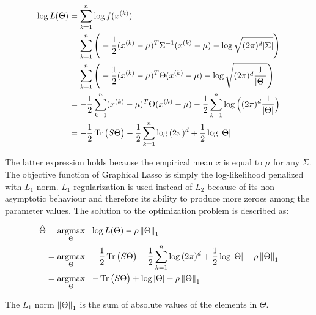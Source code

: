         \begin{equation}
            \begin{split}
                \log{L}(\Theta) & = \sum\limits_{k=1}^{n} \log{f(x^{(k)})} \\
                & = \sum\limits_{k=1}^{n} \Bigg( -\frac{1}{2} (x^{(k)} - \mu)^T \Sigma^{-1} (x^{(k)} - \mu) - \log{\sqrt{(2\pi)^d \vert\Sigma\vert}} \Bigg) \\
                & = \sum\limits_{k=1}^{n} \Bigg( -\frac{1}{2} (x^{(k)} - \mu)^T \Theta (x^{(k)} - \mu) - \log{\sqrt{(2\pi)^d \frac{1}{\vert\Theta\vert}}} \Bigg) \\
                & = -\frac{1}{2} \sum\limits_{k=1}^{n} (x^{(k)} - \mu)^T \Theta (x^{(k)} - \mu) 
                    - \frac{1}{2} \sum\limits_{k=1}^{n} \log{\Big((2\pi)^d \frac{1}{\vert\Theta\vert}\Big)} \\
                & = -\frac{1}{2} \operatorname{Tr}\big(S \Theta\big) - \frac{1}{2} \sum\limits_{k=1}^{n} \log{(2\pi)^d} + \frac{1}{2} \log{\vert\Theta\vert} \\
            \end{split}
        \end{equation}

        The latter expression holds because the empirical mean $\bar{x}$ is equal to $\mu$ for any $\Sigma$.
        The objective function of Graphical Lasso is simply the log-likelihood penalized with $L_1$ norm. $L_1$ regularization is used instead of $L_2$ because
        of its non-asymptotic behaviour and therefore its ability to produce more zeroes among the parameter values.
        The solution to the optimization problem is described as:

        \begin{equation}
            \begin{split}
                \hat{\Theta} & = \argmax_{\Theta} \ \ \log{L}(\Theta) - \rho \norm{\Theta}_1 \\
                & = \argmax_{\Theta} \ \ -\frac{1}{2} \trace\big(S \Theta\big) - \frac{1}{2} \sum\limits_{k=1}^{n} 
                    \log{(2\pi)^d} + \frac{1}{2} \log{\vert\Theta\vert} - \rho \norm{\Theta}_1 \\
                & = \argmax_{\Theta} \ \ -\trace\big(S \Theta\big) + \log{\vert\Theta\vert} - \rho \norm{\Theta}_1 \\
            \end{split}
        \end{equation}

        The $L_1$ norm $\left\lVert\Theta\right\rVert_1$ is the sum of absolute values of the elements in $\Theta$.
        \todo{}


